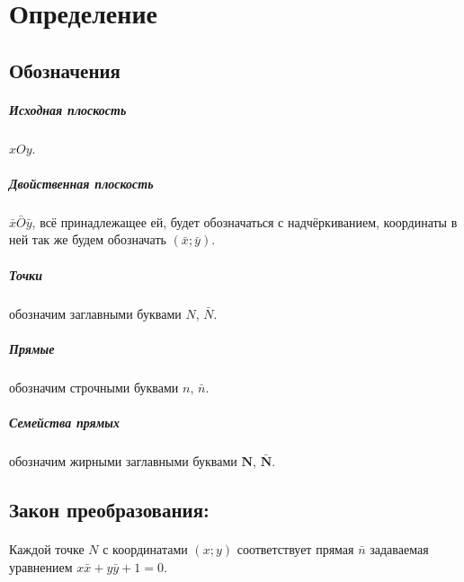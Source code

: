 \section{Определение}


\subsection{Обозначения}
\subparagraph{Исходная плоскость} $xOy$.
\subparagraph{Двойственная плоскость} $\bar{x}\bar{O}\bar{y}$, всё принадлежащее ей, будет обозначаться с надчёркиванием, координаты в ней так же будем обозначать $(\bar{x}; \bar{y})$.
\subparagraph{Точки} обозначим заглавными буквами $N$, $\bar{N}$.
\subparagraph{Прямые} обозначим строчными буквами $n$, $\bar{n}$.
\subparagraph{Семейства прямых} обозначим жирными заглавными буквами $\mathbf{N}$, $\mathbf{\bar{N}}$.

\subsection{Закон преобразования:}
\paragraph{}Каждой точке $N$ с координатами $(x; y)$ соответствует прямая $\bar{n}$ задаваемая уравнением $x\bar{x} + y\bar{y} + 1 = 0$.